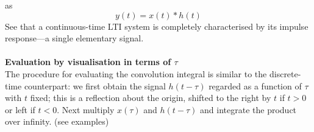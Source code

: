 \documentclass{report}
\begin{document}
as
\begin{equation*}
y(t)=x(t)*h(t)
\end{equation*}
See that a continuous-time LTI system is completely characterised by its impulse response---a single elementary signal.\\
\vspace{1mm}\\
\textbf{Evaluation by visualisation in terms of $\tau$}\\
The procedure for evaluating the convolution integral is similar to the discrete-time counterpart: we first obtain the signal
$h(t-\tau)$ regarded as a function of $\tau$ with $t$ fixed; this is a reflection about the origin, shifted to the right by 
$t$ if $t>0$ or left if $t<0$. Next multiply $x(\tau)$ and $h(t-\tau)$ and integrate the product over infinity. (see examples)
\newpage
\end{document}
